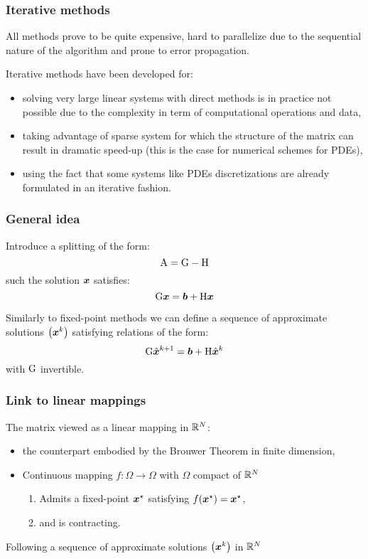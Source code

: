 \begin{frame}
  \frametitle{Iterative methods}

All methods prove to be quite expensive, hard to parallelize due to the sequential nature of the algorithm and prone to error propagation.

\medskip
Iterative methods have been developed for:
\begin{itemize}
\item solving very large linear systems with direct methods is in practice not possible due to the complexity in term of computational operations and data,
\item taking advantage of sparse system for which the structure of the matrix can result in dramatic speed-up (this is the case for numerical schemes for PDEs),
\item using the fact that some systems like PDEs discretizations are already formulated in an iterative fashion.
\end{itemize}

\end{frame}

\begin{frame}
  \frametitle{General idea}

Introduce a splitting of the form:
\[
{\mathrm A} = {\mathrm G} - {\mathrm H}
\]
such the solution ${\boldsymbol x}$ satisfies:
\[
{\mathrm G} {\boldsymbol x} = {\boldsymbol b} + {\mathrm H} {\boldsymbol x}
\]

Similarly to fixed-point methods we can define a sequence of approximate solutions $\bigl({\boldsymbol x}^k\bigr)$ satisfying relations of the form:
\[
{\mathrm G} \hat{\boldsymbol x}^{k+1} = {\boldsymbol b} + {\mathrm H} \hat{\boldsymbol x}^{k}
\]
with ${\mathrm G}$ invertible.

\end{frame}

\begin{frame}
  \frametitle{Link to linear mappings}

The matrix viewed as a linear mapping in ${\mathbb{R}^N}$:
\begin{itemize}
\item the counterpart embodied by the Brouwer Theorem in finite dimension,
\item Continuous mapping $f : \Omega \rightarrow \Omega$ with $\Omega$ compact of ${\mathbb{R}^N}$
\begin{enumerate}
\item Admits a fixed-point ${\boldsymbol x}^\star$ satisfying $f({\boldsymbol x}^\star) = {\boldsymbol x}^\star$,
\item and is contracting.
\end{enumerate}
\end{itemize}

\bigskip
Following a sequence of approximate solutions $\bigl({\boldsymbol x}^k\bigr)$ in ${\mathbb{R}^N}$

\end{frame}

